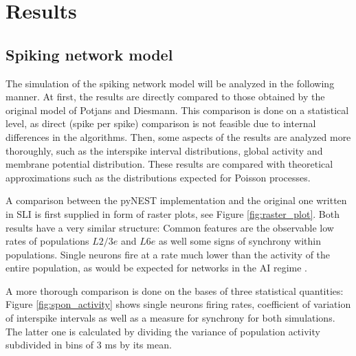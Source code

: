 \section{Results}
\label{sec:results}

\subsection{Spiking network model}
The simulation of the spiking network model will be analyzed in the following manner. 
At first, the results are directly compared to those obtained by the original 
model of Potjans and Diesmann. This comparison is done on a statistical level, 
as direct (spike per spike) comparison is not feasible due to internal differences
in the algorithms. 
Then, some aspects of the results are analyzed more thoroughly, such as 
the interspike interval distributions, global activity and 
membrane potential distribution. These results are compared with 
theoretical approximations such as the distributions expected for Poisson processes. 

A comparison between the pyNEST implementation and the original one written in SLI
is first supplied in form of raster plots, see Figure \ref{fig:raster_plot}. 
Both results have a very similar structure: Common features are the observable low 
rates of populations $L2/3e$ and $L6e$ as well some signs of synchrony within populations. Single neurons fire at a rate much lower than the activity of the 
entire population, as would be expected for networks in the AI regime \cite{brunel2000}. 

A more thorough comparison is done on the bases of three statistical quantities: 
Figure \ref{fig:spon_activity} shows single neurons firing rates, coefficient of 
variation of interspike intervals as well as a measure for synchrony for both 
simulations. The latter one is calculated by dividing the variance of population
activity subdivided in bins of 3 ms by its mean. 


